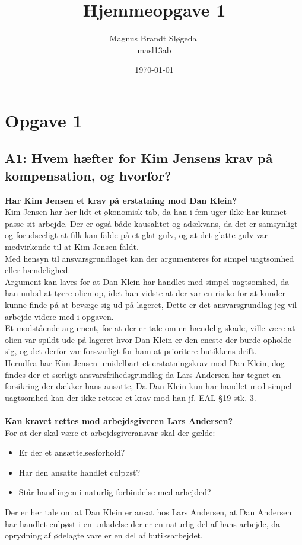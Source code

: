 \documentclass[11pt, a4paper]{article}
\title{Hjemmeopgave 1}
\author{Magnus Brandt Sløgedal\\ masl13ab}
\date{\today}
\begin{document}
\maketitle
\section{Opgave 1}
\subsection*{A1: Hvem hæfter for Kim Jensens krav på kompensation, og hvorfor?}
\textbf{Har Kim Jensen et krav på erstatning mod Dan Klein?}\\
Kim Jensen har her lidt et økonomisk tab, da han i fem uger ikke har kunnet
passe sit arbejde. Der er også både kausalitet og adækvans, da det er
samsynligt og forudseeligt at filk kan falde på et glat gulv, og at det glatte
gulv var medvirkende til at Kim Jensen faldt.\\
Med hensyn til ansvarsgrundlaget kan der argumenteres for simpel uagtsomhed
eller hændelighed.\\
Argument kan laves for at Dan Klein har handlet med simpel uagtsomhed, da han
unlod at tørre olien op, idet han vidste at der var en risiko for at kunder
kunne finde på at bevæge sig ud på lageret, Dette er det ansvarsgrundlag jeg vil
arbejde videre med i opgaven.\\
Et modstående argument, for at der er tale om en hændelig skade, ville være at
olien var spildt ude på lageret hvor Dan Klein er den eneste der burde opholde
sig, og det derfor var forsvarligt for ham at prioritere butikkens drift.\\
Herudfra har Kim Jensen umidelbart et erstatningskrav mod Dan Klein, dog findes
der et særligt ansvarsfrihedsgrundlag da Lars Andersen har tegnet en forsikring
der dækker hans ansatte, Da Dan Klein kun har handlet med simpel uagtsomhed kan
der ikke rettese et krav mod han jf. EAL §19 stk. 3.\\
\\
\textbf{Kan kravet rettes mod arbejdsgiveren Lars Andersen?}\\
For at der skal være et arbejdsgiveransvar skal der gælde:
\begin{itemize}
  \item Er der et ansættelsesforhold?
  \item Har den ansatte handlet culpøst?
  \item Står handlingen i naturlig forbindelse med arbejded?
\end{itemize}
Der er her tale om at Dan Klein er ansat hos Lars Andersen, at Dan Andersen
har handlet culpøst i en unladelse der er en naturlig del af hans arbejde, da
oprydning af ødelagte vare er en del af butiksarbejdet.
\end{document}
